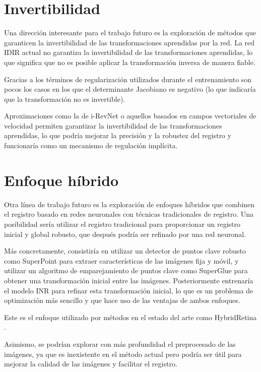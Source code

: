\section{Invertibilidad}
\label{sec:Invertibilidade}

Una dirección interesante para el trabajo futuro es la exploración de métodos que garanticen la invertibilidad de las transformaciones aprendidas por la red.
La red IDIR actual no garantiza la invertibilidad de las transformaciones aprendidas, lo que significa que no es posible aplicar la transformación inversa de manera fiable.

Gracias a los términos de regularización utilizados durante el entrenamiento son pocos los casos en los que el determinante Jacobiano es negativo (lo que indicaría que la transformación no es invertible).

Aproximaciones como la de i-RevNet \cite{jacobsen2018irevnetdeepinvertiblenetworks} o aquellos basados en campos vectoriales de velocidad \cite{sun2024medicalimageregistrationneural} permiten garantizar la invertibilidad de las transformaciones aprendidas, lo que podría mejorar la precisión y la robustez del registro y funcionaría como un mecanismo de regulación implícita.

\section{Enfoque híbrido}
\label{sec:Enfoque híbrido}

Otra línea de trabajo futuro es la exploración de enfoques híbridos que combinen el registro basado en redes neuronales con técnicas tradicionales de registro.
Una posibilidad sería utilizar el registro tradicional para proporcionar un registro inicial y global robusto, que después podría ser refinado por una red neuronal.

Más concretamente, consistiría en utilizar un detector de puntos clave robusto como SuperPoint \cite{superpoint} para extraer características de las imágenes fija y móvil, y utilizar un algoritmo de emparejamiento de puntos clave como SuperGlue \cite{superglue} para obtener una transformación inicial entre las imágenes.
Posteriormente entrenaría el modelo INR para refinar esta transformación inicial, lo que es un problema de optimización más sencillo y que hace uso de las ventajas de ambos enfoques.

Este es el enfoque utilizado por métodos en el estado del arte como HybridRetina \cite{liu2024progressiveretinalimageregistration}.

Asimismo, se podrían explorar con más profundidad el preprocesado de las imágenes, ya que es inexistente en el método actual pero podría ser útil para mejorar la calidad de las imágenes y facilitar el registro.